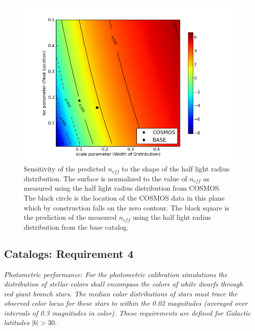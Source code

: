 \documentclass[]{article}
\begin{document}
\begin{figure}[H]
\centering
\includegraphics[width=5in]{validation_figures/size_sensitivity.png}
\caption{Sensitivity of the predicted $n_{eff}$ to the shape of the half light radius distribution.  
The surface is normalized to the value of $n_{eff}$ as measured using the half light radius distribution from COSMOS.  The black circle
is the location of the COSMOS data in this plane which by construction falls on the zero contour.  The black square is the prediction of
the measured $n_{eff}$ using the half light radius distribution from the base catalog.\label{fig:size_sens}}
\end{figure}

\subsection{Catalogs: Requirement 4}

{\it Photometric performance: For the photometric calibration
  simulations the distribution of stellar colors shall encompass the
  colors of white dwarfs through red giant branch stars.  The median
  color distributions of stars must trace the observed color locus for
  these stars to within the 0.02 magnitudes (averaged over intervals
  of 0.3 magnitudes in color). These requirements are defined for
  Galactic latitudes $|b|>30$.}\\
\end{document}
